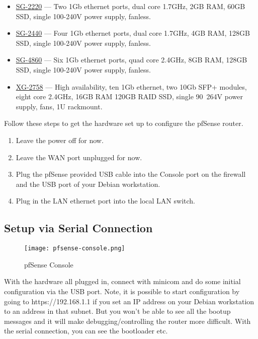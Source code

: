 \begin{itemize}
 \item \href{https://store.pfsense.org/SG-2220/}{SG-2220} --- Two 1Gb ethernet ports, dual core 1.7GHz, 2GB RAM, 60GB SSD, single 100-240V power supply, fanless.
 \item \href{https://store.pfsense.org/SG-2440/}{SG-2440} --- Four 1Gb ethernet ports, dual core 1.7GHz, 4GB RAM, 128GB SSD, single 100-240V power supply, fanless.
 \item \href{https://store.pfsense.org/SG-4860/}{SG-4860} --- Six 1Gb ethernet ports, quad core 2.4GHz, 8GB RAM, 128GB SSD, single 100-240V power supply, fanless.
 \item \href{https://store.pfsense.org/XG-2758-HA.aspx}{XG-2758} --- High availability, ten 1Gb ethernet, two 10Gb SFP+ modules, eight core 2.4GHz, 16GB RAM 120GB RAID SSD, single 90~264V power supply, fans, 1U rackmount.
\end{itemize}

Follow these steps to get the hardware set up to configure the pfSense router.

\begin{enumerate}
 \item Leave the power off for now.
 \item Leave the WAN port unplugged for now.
 \item Plug the pfSense provided USB cable into the Console port on the firewall and the USB port of your Debian workstation.
 \item Plug in the LAN ethernet port into the local LAN switch.
\end{enumerate}

\subsection{Setup via Serial Connection}
\begin{figure}[h!]
\texttt{[image: pfsense-console.png]}
 \caption{pfSense Console}
 \label{fig:pfsense-console}
\end{figure}

With the hardware all plugged in, connect with minicom and do some initial configuration via the USB port.
Note, it is possible to start configuration by going to https://192.168.1.1 if you set an IP address on your
Debian workstation to an address in that subnet. But you won't be able to see all the bootup messages and it
will make debugging/controlling the router more difficult. With the serial connection, you can see the bootloader etc.

